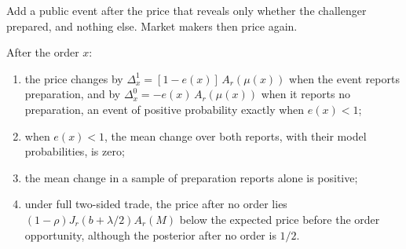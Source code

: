 Add a public event after the price that reveals only whether the challenger prepared, and nothing else. Market
makers then price again.

\begin{proposition}\label{prop:announcement}
After the order \(x\):
\begin{enumerate}[label=(\roman*),leftmargin=2em]
\item the price changes by \(\Delta^1_x=[1-e(x)]\,A_r(\mu(x))\) when the event reports preparation, and by
\(\Delta^0_x=-e(x)\,A_r(\mu(x))\) when it reports no preparation, an event of positive probability exactly when
\(e(x)<1\);
\item when \(e(x)<1\), the mean change over both reports, with their model probabilities, is zero;
\item the mean change in a sample of preparation reports alone is positive;
\item under full two-sided trade, the price after no order lies \((1-\rho)J_r(b+\lambda/2)A_r(M)\) below the expected
price before the order opportunity, although the posterior after no order is \(1/2\).
\end{enumerate}
\end{proposition}

